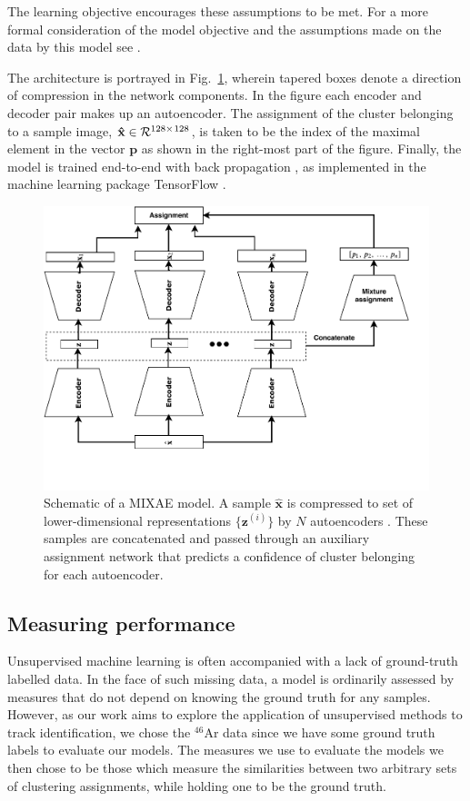\documentclass[review,sort&compress]{elsarticle}
\begin{document}
The learning objective encourages these assumptions to be met. For a more formal consideration of the model objective and the assumptions made on the data by this model see \citet{Zhang}.

The architecture is portrayed in Fig.~\ref{fig:mixae}, wherein tapered boxes denote a direction of compression in the network components. In the figure each encoder and decoder pair makes up an autoencoder. The assignment of the cluster belonging to a sample image, $\mathbf{\hat{x}} \in \mathcal{R}^{128 \times \hspace{0.01in} 128} $, is taken to be the index of the maximal element in the vector $\mathbf{p}$ as shown in the right-most part of the figure. Finally, the model is trained end-to-end with back propagation \cite{Linnainmaa1976}, as implemented in the machine learning package TensorFlow \cite{tensorflow}.


\begin{figure}[tbh]
	\centering
	\includegraphics[width=.8\textwidth]{plots/mixae.pdf}
	\caption[Mixture of autoencoders schematic]{Schematic of a MIXAE model. A sample $\hat{\boldsymbol{x}}$ is compressed to set of lower-dimensional representations $\{\boldsymbol{z}^{(i)}\}$ by $N$ autoencoders \cite{Zhang}. These samples are concatenated and passed through an auxiliary assignment network that predicts a confidence of cluster belonging for each autoencoder.}
	\label{fig:mixae}
\end{figure}


\subsection{Measuring performance}
Unsupervised machine learning  is often accompanied with a  lack of ground-truth labelled data. In the face of such missing data, a model is ordinarily assessed by measures that do not depend on knowing the ground truth for any samples. 
However, as our work aims to explore the application of unsupervised methods to track identification, we chose the ${}^{46}$Ar data since we have some ground truth labels to evaluate our models. The measures we use to evaluate the models we then chose to be those which measure the similarities between two arbitrary sets of clustering assignments, while holding one to be the ground truth. 
\end{document}
